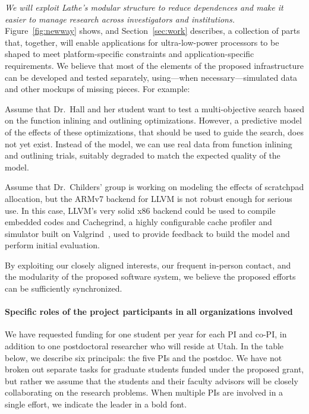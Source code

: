 \emph{We will exploit Lathe's modular structure to reduce dependences
  and make it easier to manage research across investigators and
  institutions.}
%
Figure~\ref{fig:newway} shows, and Section~\ref{sec:work} describes, a
collection of parts that, together, will enable applications for
ultra-low-power processors to be shaped to meet platform-specific
constraints and application-specific requirements.
%
We believe that most of the elements of the proposed infrastructure
can be developed and tested separately, using---when
necessary---simulated data and other mockups of missing pieces.
%
For example:
\begin{compactitem}
\item
Assume that Dr.~Hall and her student want to test a multi-objective
search based on the function inlining and outlining optimizations.
%
However, a predictive model of the effects of these optimizations,
that should be used to guide the search, does not yet exist.
%
Instead of the model, we can use real data from function inlining and
outlining trials, suitably degraded to match the expected quality of
the model.
\item
Assume that Dr.~Childers' group is working on modeling the effects
of scratchpad allocation, but the ARMv7 backend for LLVM is not robust
enough for serious use.
%
In this case, LLVM's very solid x86 backend could be used to compile
embedded codes and Cachegrind, a highly configurable cache profiler
and simulator built on Valgrind~\cite{Nethercote07}, used to provide
feedback to build the model and perform initial evaluation.
\end{compactitem}
%
By exploiting our closely aligned interests, our frequent in-person
contact, and the modularity of the proposed software system, we
believe the proposed efforts can be sufficiently synchronized.


\paragraph{Specific roles of the project participants in all organizations
involved}

We have requested funding for one student per year for each PI and
co-PI, in addition to one postdoctoral researcher who will reside at Utah.
%
In the table below, we describe six principals: the five PIs and
the postdoc.
%
We have not broken out separate tasks for graduate students funded
under the proposed grant, but rather we assume that the students and
their faculty advisors will be closely collaborating on the research
problems.
%
When multiple PIs are involved in a single effort, we indicate the
leader in a bold font.

